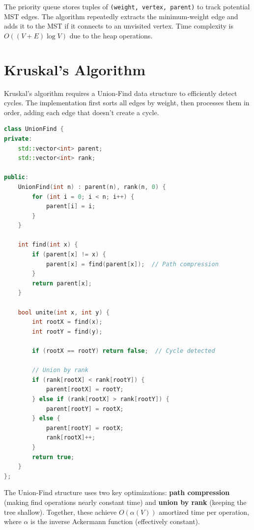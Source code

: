 \documentclass[12pt, a4paper]{report}
\begin{document}
The priority queue stores tuples of \texttt{(weight, vertex, parent)} to track potential MST edges. The algorithm repeatedly extracts the minimum-weight edge and adds it to the MST if it connects to an unvisited vertex. Time complexity is $O((V + E) \log V)$ due to the heap operations.

\newpage

\section{Kruskal's Algorithm}

Kruskal's algorithm requires a Union-Find data structure to efficiently detect cycles. The implementation first sorts all edges by weight, then processes them in order, adding each edge that doesn't create a cycle.

\begin{lstlisting}[language=C++, caption={Union-Find data structure}]
class UnionFind {
private:
    std::vector<int> parent;
    std::vector<int> rank;
    
public:
    UnionFind(int n) : parent(n), rank(n, 0) {
        for (int i = 0; i < n; i++) {
            parent[i] = i;
        }
    }
    
    int find(int x) {
        if (parent[x] != x) {
            parent[x] = find(parent[x]);  // Path compression
        }
        return parent[x];
    }
    
    bool unite(int x, int y) {
        int rootX = find(x);
        int rootY = find(y);
        
        if (rootX == rootY) return false;  // Cycle detected
        
        // Union by rank
        if (rank[rootX] < rank[rootY]) {
            parent[rootX] = rootY;
        } else if (rank[rootX] > rank[rootY]) {
            parent[rootY] = rootX;
        } else {
            parent[rootY] = rootX;
            rank[rootX]++;
        }
        return true;
    }
};
\end{lstlisting}

The Union-Find structure uses two key optimizations: \textbf{path compression} (making find operations nearly constant time) and \textbf{union by rank} (keeping the tree shallow). Together, these achieve $O(\alpha(V))$ amortized time per operation, where $\alpha$ is the inverse Ackermann function (effectively constant).

\newpage
\end{document}
